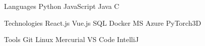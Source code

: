 

\begin{cvskills}

  \cvskill
  {Languages} %
  {
    Python
      {\enskip\cdotp\enskip} JavaScript
      {\enskip\cdotp\enskip} Java
      {\enskip\cdotp\enskip} C
  } %

  \cvskill
  {Technologies} %
  {
    React.js
      {\enskip\cdotp\enskip} Vue.js
      {\enskip\cdotp\enskip} SQL
      {\enskip\cdotp\enskip} Docker
      {\enskip\cdotp\enskip} MS Azure
      {\enskip\cdotp\enskip} PyTorch3D
  } %

  \cvskill
  {Tools} %
  {
    Git
      {\enskip\cdotp\enskip} Linux
      {\enskip\cdotp\enskip} Mercurial
      {\enskip\cdotp\enskip} VS Code
      {\enskip\cdotp\enskip} IntelliJ
  } %


\end{cvskills}
